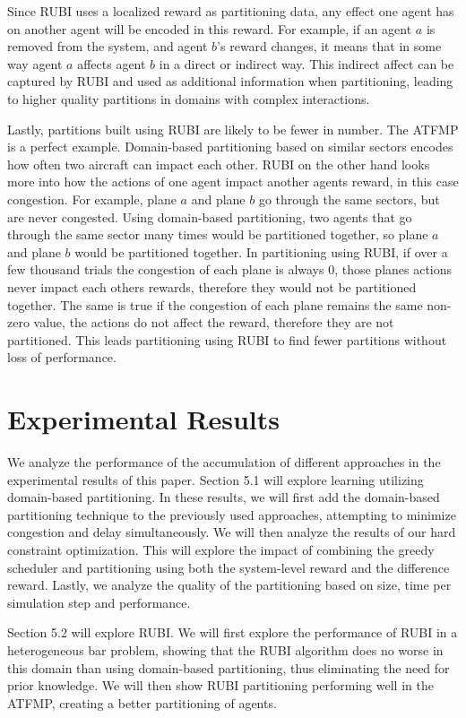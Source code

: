 \documentclass[onehalf,11pt]{beavtex}
\begin{document}
Since RUBI uses a localized reward as partitioning data, any effect one agent has on another agent will be encoded in this reward. For example, if an agent $a$ is removed from the system, and agent $b$'s reward changes, it means that in some way agent $a$ affects agent $b$ in a direct or indirect way. This indirect affect can be captured by RUBI and used as additional information when partitioning, leading to higher quality partitions in domains with complex interactions.

Lastly, partitions built using RUBI are likely to be fewer in number. The ATFMP is a perfect example. Domain-based partitioning based on similar sectors encodes how often two aircraft can impact each other. RUBI on the other hand looks more into how the actions of one agent impact another agents reward, in this case congestion. For example, plane $a$ and plane $b$ go through the same sectors, but are never congested. Using domain-based partitioning, two agents that go through the same sector many times would be partitioned together, so plane $a$ and plane $b$ would be partitioned together. In partitioning using RUBI, if over a few thousand trials the congestion of each plane is always 0, those planes actions never impact each others rewards, therefore they would not be partitioned together. The same is true if the congestion of each plane remains the same non-zero value, the actions do not affect the reward, therefore they are not partitioned. This leads partitioning using RUBI to find fewer partitions without loss of performance.

\chapter{Experimental Results}

We analyze the performance of the accumulation of different approaches in the experimental results of this paper. Section 5.1 will explore learning utilizing domain-based partitioning. In these results, we will first add the domain-based partitioning technique to the previously used approaches, attempting to minimize congestion and delay simultaneously. We will then analyze the results of our hard constraint optimization. This will explore the impact of combining the greedy scheduler and partitioning using both the system-level reward and the difference reward. Lastly, we analyze the quality of the partitioning based on size, time per simulation step and performance. 

Section 5.2 will explore RUBI. We will first explore the performance of RUBI in a heterogeneous bar problem, showing that the RUBI algorithm does no worse in this domain than using domain-based partitioning, thus eliminating the need for prior knowledge. We will then show RUBI partitioning performing well in the ATFMP, creating a better partitioning of agents. 
\end{document}
